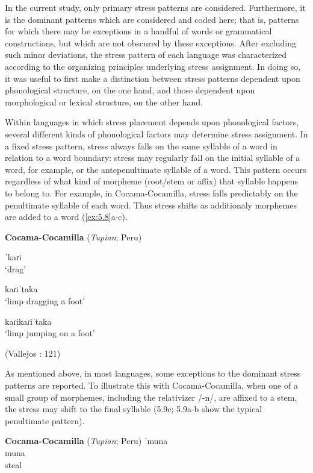   In the current study, only primary stress patterns are considered. Furthermore, it is the dominant patterns which are considered and coded here; that is, patterns for which there may be exceptions in a handful of words or grammatical constructions, but which are not obscured by these exceptions. After excluding such minor deviations, the stress pattern of each language was characterized according to the organizing principles underlying stress assignment. In doing so, it was useful to first make a distinction between stress patterns dependent upon phonological structure, on the one hand, and those dependent upon morphological or lexical structure, on the other hand.

   Within languages in which stress placement depends upon phonological factors, several different kinds of phonological factors may determine stress assignment. In a fixed stress pattern, stress always falls on the same syllable of a word in relation to a word boundary: stress may regularly fall on the initial syllable of a word, for example, or the antepenultimate syllable of a word. This pattern occurs regardless of what kind of morpheme (root/stem or affix) that syllable happens to belong to. For example, in Cocama-Cocamilla, stress falls predictably on the penultimate syllable of each word. Thus stress shifts as additionaly morphemes are added to a word (\ref{ex:5.8}a-c).

\ea\label{ex:5.8}
  \textbf{Cocama-Cocamilla} (\textit{Tupian}; Peru)

\ea   ˈkaɾi\\
\glt ‘drag’

\ex   kaɾiˈtaka\\
\glt ‘limp dragging a foot’

\ex   kaɾikaɾiˈtaka\\
\glt ‘limp jumping on a foot’

(Vallejos \citealt{Yopán2010}: 121)
\z
\z

  As mentioned above, in most languages, some exceptions to the dominant stress patterns are reported. To illustrate this with Cocama-Cocamilla, when one of a small group of morphemes, including the relativizer /-n/, are affixed to a stem, the stress may shift to the final syllable (5.9c; 5.9a-b show the typical penultimate pattern).

\ea\label{ex:5.9}
  \textbf{Cocama-Cocamilla} (\textit{Tupian}; Peru)
\ea   ˈmuna\\
  muna\\
steal

